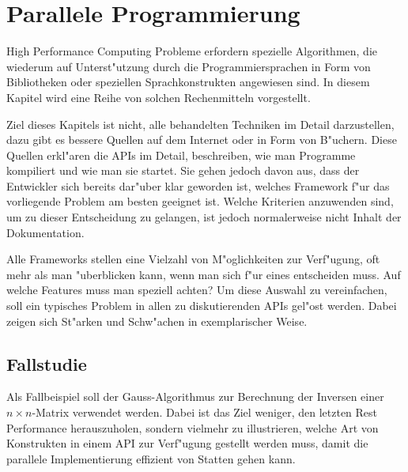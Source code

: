 \chapter{Parallele Programmierung}
High Performance Computing Probleme erfordern spezielle Algorithmen, die
wiederum auf Unterst"utzung durch die Programmiersprachen in Form von
Bibliotheken oder speziellen Sprachkonstrukten angewiesen sind.
In diesem Kapitel wird eine Reihe von solchen Rechenmitteln vorgestellt.

Ziel dieses Kapitels ist nicht, alle behandelten Techniken im Detail
darzustellen, dazu gibt es bessere Quellen auf dem Internet oder in
Form von B"uchern.
Diese Quellen erkl"aren die APIs im Detail, beschreiben, wie man Programme
kompiliert und wie man sie startet. Sie gehen jedoch davon aus, dass der
Entwickler sich bereits dar"uber klar geworden ist, welches Framework
f"ur das vorliegende Problem am besten geeignet ist.
Welche Kriterien anzuwenden sind, um zu dieser Entscheidung zu gelangen,
ist jedoch normalerweise nicht Inhalt der Dokumentation.

Alle Frameworks stellen eine Vielzahl von M"oglichkeiten zur
Verf"ugung, oft mehr als man "uberblicken kann, wenn man sich f"ur
eines entscheiden muss.
Auf welche Features muss man speziell achten? Um diese Auswahl
zu vereinfachen, soll ein typisches Problem in allen zu diskutierenden
APIs gel"ost werden. Dabei zeigen sich St"arken und Schw"achen  in
exemplarischer Weise.

\section{Fallstudie}
Als Fallbeispiel soll der Gauss-Algorithmus zur Berechnung der Inversen
einer $n\times n$-Matrix verwendet werden. Dabei ist das Ziel weniger,
den letzten Rest Performance herauszuholen, sondern vielmehr zu
illustrieren, welche Art von Konstrukten in einem API zur Verf"ugung
gestellt werden muss, damit die parallele Implementierung effizient
von Statten gehen kann.

